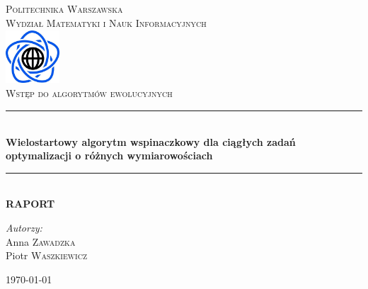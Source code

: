 \documentclass{article}
\begin{document}

\begin{titlepage}

\newcommand{\HRule}{\rule{\linewidth}{0.5mm}}

\begin{center}

\textsc{\LARGE Politechnika Warszawska}\\[0.5cm]
\textsc{\Large Wydział Matematyki i Nauk Informacyjnych}\\[1cm]

\includegraphics[width=2cm, height=2cm]{logo}\\[1cm]


\textsc{\Huge Wstęp do algorytmów ewolucyjnych}\\[0.5cm]


\HRule \\[0.4cm]
{ \LARGE \bfseries Wielostartowy algorytm wspinaczkowy dla ciągłych zadań optymalizacji o różnych wymiarowościach}\\[0.2cm]
 

\HRule \\[0.4cm]
{  \bfseries RAPORT}\\[2.5cm]

\begin{flushright}
	\Large \emph{Autorzy:}\\[0.5cm]
Anna \textsc{Zawadzka}\\
Piotr \textsc{Waszkiewicz}\\[1.5cm]
\end{flushright} 

\vfill
{\large \today}\\[1cm]
	
\end{center}

\end{titlepage}

\newpage
\end{document}
